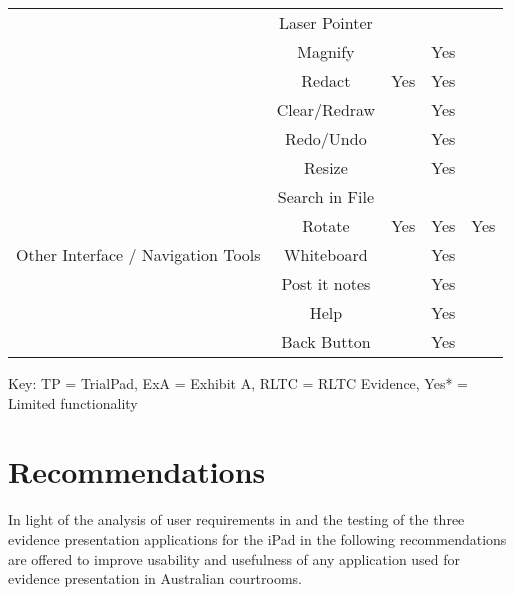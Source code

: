 \begin{center}
\begin{table}[h!]
\begin{tabular}{|l| c|| c| c| c |}
 \cline{2-5}
& Laser Pointer&&&\\
\cline{2-5}
&Magnify &&Yes&\\
\cline{2-5}
&Redact&Yes&Yes&\\
\cline{2-5}
&Clear/Redraw&&Yes&\\
\cline{2-5}
&Redo/Undo&&Yes&\\
\hline
\multirow{7}{*}{Other Interface / Navigation Tools} & Resize  & &Yes& \\
\cline{2-5}
 &Search in File&&&\\
 \cline{2-5}
 &Rotate&Yes&Yes&Yes\\
 \cline{2-5}
 &Whiteboard&&Yes&\\
 \cline{2-5}
 &Post it notes&&Yes&\\
 \cline{2-5}
 &Help&&Yes&\\
 \cline{2-5}
 &Back Button&&Yes&\\
\hline
\end{tabular}
\end{table}



Key: TP = TrialPad, ExA = Exhibit A, RLTC = RLTC Evidence, Yes* = Limited functionality
\end{center}


\section{Recommendations}
\doublespace
In light of the analysis of user requirements in  and the testing of the three evidence presentation applications for the iPad in  the following recommendations are offered to improve usability and usefulness of any application used for evidence presentation in Australian courtrooms.\\
